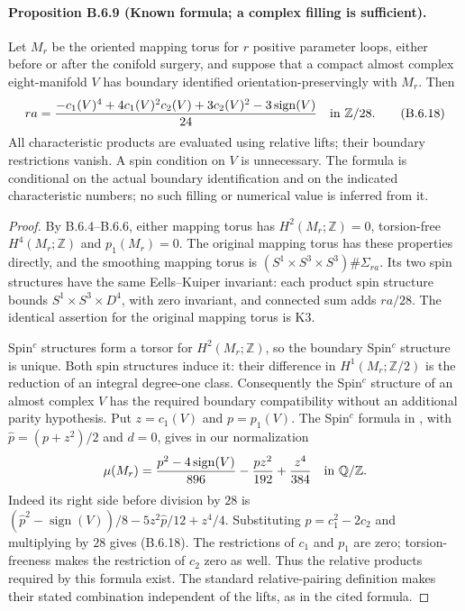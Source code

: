 \paragraph{Proposition B.6.9 (Known formula; a complex filling is sufficient).}
Let $M_r$ be the oriented mapping torus for $r$ positive parameter
loops, either before or after the conifold surgery, and suppose
that a compact almost complex eight-manifold $V$ has boundary
identified orientation-preservingly with $M_r$. Then
\[
 r a=\frac{-c_1(V)^4+4c_1(V)^2c_2(V)+3c_2(V)^2
                    -3\operatorname{sign}(V)}{24}
       \quad\hbox{in }\mathbb Z/28.
 \tag{B.6.18}
\]
All characteristic products are evaluated using relative lifts;
their boundary restrictions vanish. A spin condition on $V$ is
unnecessary. The formula is conditional on the actual boundary
identification and on the indicated characteristic numbers;
no such filling or numerical value is inferred from it.

\begin{proof}
By B.6.4--B.6.6, either mapping torus has $H^2(M_r;\mathbb Z)=0$,
torsion-free $H^4(M_r;\mathbb Z)$ and $p_1(M_r)=0$. The original
mapping torus has these properties directly, and the smoothing
mapping torus is $(S^1\times S^3\times S^3)\#\Sigma_{ra}$.
Its two spin structures have the same Eells--Kuiper invariant:
each product spin structure bounds $S^1\times S^3\times D^4$,
with zero invariant, and connected sum adds $ra/28$.
The identical assertion for the original mapping torus is K3.

Spin$^c$ structures form a torsor for $H^2(M_r;\mathbb Z)$,
so the boundary Spin$^c$ structure is unique. Both spin structures
induce it: their difference in $H^1(M_r;\mathbb Z/2)$ is the
reduction of an integral degree-one class. Consequently the
Spin$^c$ structure of an almost complex $V$ has the required
boundary compatibility without an additional parity hypothesis.
Put $z=c_1(V)$ and $p=p_1(V)$. The Spin$^c$ formula in
\cite[Section 2.2, equation (2.1)]{mapsCrowleyNordstrom21},
with $\widehat p=(p+z^2)/2$ and $d=0$, gives in our normalization
\[
 \mu(M_r)=\frac{p^2-4\operatorname{sign}(V)}{896}
             -\frac{p z^2}{192}+\frac{z^4}{384}
             \quad\hbox{in }\mathbb Q/\mathbb Z.
\]
Indeed its right side before division by $28$ is
$(\widehat p^2-\operatorname{sign}(V))/8
-5z^2\widehat p/12+z^4/4$.
Substituting $p=c_1^2-2c_2$ and multiplying by $28$ gives
(B.6.18). The restrictions of $c_1$ and $p_1$ are zero;
torsion-freeness makes the restriction of $c_2$ zero as well.
Thus the relative products required by this formula exist.
The standard relative-pairing definition makes their stated
combination independent of the lifts, as in the cited formula.
\end{proof}

